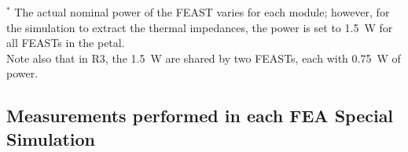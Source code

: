 \let\arraystretcha\arraystretch
\renewcommand\arraystretch{1.4} %
\begin{table}[h!]
\begin{center}
\end{center}
\caption{ Description of the 3 thermal simulations required to obtain the thermal impedances.
}
\label{tab:simulation_runs}
\end{table}
\let\arraystretch\arraystretcha

$^*$ The actual nominal power of the FEAST varies for each module; however, for the simulation to extract
the thermal impedances, the power is set to 1.5~W for all FEASTs in the petal.\\
%
Note also that in R3, the 1.5~W are shared by two FEASTs, each with 0.75~W of power.




\subsection{Measurements performed in each FEA Special Simulation}


